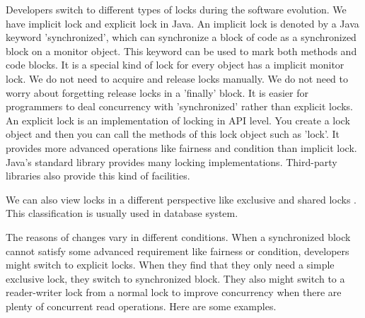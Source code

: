 Developers switch to different types of locks during the software evolution. We have implicit lock and explicit lock in Java. An implicit lock is denoted by a Java keyword 'synchronized', which can synchronize a block of code as a synchronized block on a monitor object. This keyword can be used to mark both methods and code blocks. It is a special kind of lock for every object has a implicit monitor lock. We do not need to acquire and release locks manually. We do not need to worry about forgetting release locks in a 'finally' block. It is easier for programmers to deal concurrency with 'synchronized' rather than explicit locks. An explicit lock is an implementation of locking in API level. You create a lock object and then you can call the methods of this lock object such as 'lock'. It provides more advanced operations like fairness and condition than implicit lock. Java's standard library provides many locking implementations. Third-party libraries also provide this kind of facilities.

We can also view locks in a different perspective like exclusive and shared locks \cite{journals/jacm/KedemS83}. This classification is usually used in database system.


The reasons of changes vary in different conditions. When a synchronized block cannot satisfy some advanced requirement like fairness or condition, developers might switch to explicit locks. When they find that they only need a simple exclusive lock, they switch to synchronized block. They also might switch to a reader-writer lock \cite{journals/cacm/CouroisHP71} from a normal lock to improve concurrency when there are plenty of concurrent read operations. Here are some examples.

